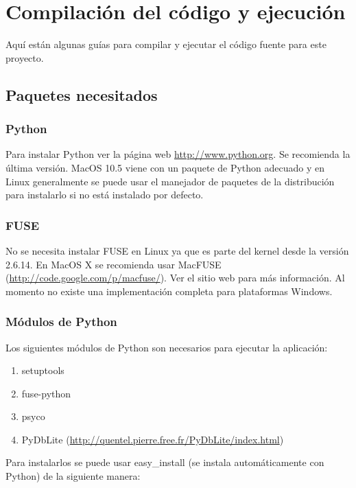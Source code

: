 \chapter{Compilación del código y ejecución}

Aquí están algunas guías para compilar y ejecutar el código fuente para este proyecto.

\section{Paquetes necesitados}

\subsection{Python}

Para instalar Python ver la página web \url{http://www.python.org}. Se recomienda la última versión. MacOS 10.5 viene con un paquete de Python adecuado y en Linux generalmente se puede usar el manejador de paquetes de la distribución para instalarlo si no está instalado por defecto.

\subsection{FUSE}

No se necesita instalar FUSE en Linux ya que es parte del kernel desde la versión 2.6.14. En MacOS X se recomienda usar MacFUSE (\url{http://code.google.com/p/macfuse/}). Ver el sitio web para más información. Al momento no existe una implementación completa para plataformas Windows.

\subsection{Módulos de Python}

Los siguientes módulos de Python son necesarios para ejecutar la aplicación:

\begin{enumerate}
\item setuptools
\item fuse-python
\item psyco
\item PyDbLite (\url{http://quentel.pierre.free.fr/PyDbLite/index.html})
\end{enumerate}

Para instalarlos se puede usar easy\_install (se instala automáticamente con Python) de la siguiente manera:

